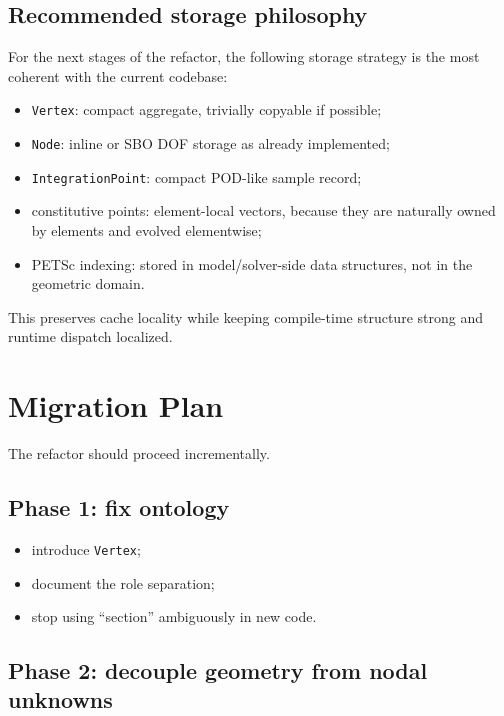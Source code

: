 \subsection{Recommended storage philosophy}

For the next stages of the refactor, the following storage strategy is the most
coherent with the current codebase:

\begin{itemize}[nosep]
  \item \texttt{Vertex}: compact aggregate, trivially copyable if possible;
  \item \texttt{Node}: inline or SBO DOF storage as already implemented;
  \item \texttt{IntegrationPoint}: compact POD-like sample record;
  \item constitutive points: element-local vectors, because they are naturally
        owned by elements and evolved elementwise;
  \item PETSc indexing: stored in model/solver-side data structures, not in the
        geometric domain.
\end{itemize}

This preserves cache locality while keeping compile-time structure strong and
runtime dispatch localized.


\section{Migration Plan}
\label{sec:domain-ontology-migration}

The refactor should proceed incrementally.

\subsection*{Phase 1: fix ontology}

\begin{itemize}[nosep]
  \item introduce \texttt{Vertex};
  \item document the role separation;
  \item stop using ``section'' ambiguously in new code.
\end{itemize}

\subsection*{Phase 2: decouple geometry from nodal unknowns}

